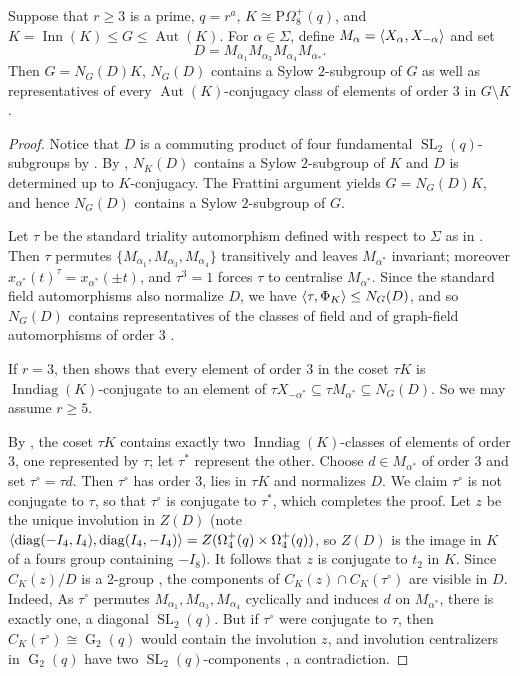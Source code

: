 \documentclass[12pt,a4paper]{amsart}
\DeclareMathOperator{\Aut}{Aut}
\DeclareMathOperator{\Inn}{Inn}
\DeclareMathOperator{\Inndiag}{Inndiag}
\DeclareMathOperator{\G}{G}
\DeclareMathOperator{\SL}{SL}
\DeclareMathOperator{\diag}{diag}
\DeclarePairedDelimiter{\gen}{\langle}{\rangle}
\begin{document}
\begin{lemma}\label{lem:NGD struct}
 Suppose that $r\ge 3$ is a prime, $q=r^a$,    $K\cong \mathrm P \Omega_{8}^+(q)$, and $K=\Inn(K)\le G\le \Aut(K)$.
   For $\alpha \in \Sigma$, define  $M_\alpha= \gen{X_{\alpha},X_{-\alpha}}$ and set $$D= M_{\alpha_1}M_{\alpha_3}M_{\alpha_4}M_{\alpha_*}.$$
 Then $G= N_G(D)K$, $N_G(D)$ contains a Sylow $2$-subgroup of $G$ as well as representatives of every $\Aut(K)$-conjugacy class of elements of order $3$ in $G \setminus K$.
\end{lemma}
\begin{proof} Notice that $ D$ is a commuting product of four fundamental $\SL_2(q)$-subgroups by \cite[Theorem 4.10.6]{GLS3}.
By \cite[Theorem 4.10.6(a),(b)]{GLS3}, $N_K(D)$ contains a Sylow
$2$-subgroup of $K$ and $D$ is determined up to $K$-conjugacy. The
Frattini argument yields $G=N_G(D)K$, and hence $N_G(D)$ contains a
Sylow $2$-subgroup of $G$.

Let $\tau$ be the standard triality automorphism defined with respect to $\Sigma$ as
in \cite[Theorem 2.5.1(d)]{GLS3}. Then $\tau$ permutes
$\{M_{\alpha_1},M_{\alpha_3},M_{\alpha_4}\}$ transitively and leaves
$M_{\alpha^*}$ invariant; moreover $x_{\alpha^*}(t)^\tau
=x_{\alpha^*}(\pm t)$, and $\tau^3=1$ forces
  $\tau$ to centralise $M_{\alpha^*}$. Since the standard
field automorphisms also normalize $D$, we have $\gen{\tau,\Phi_K}\le
N_G(D)$, and so $N_G(D)$ contains representatives of the classes of
field and of graph-field automorphisms of order $3$
\cite[Proposition 4.9.1]{GLS3}.

If $r=3$, then
\cite[Proposition 4.9.2(g)]{GLS3} shows that every element of order $3$ in the coset $\tau K$ is $\Inndiag(K)$-conjugate to an element of $\tau
X_{-\alpha^*}\subseteq \tau M_{\alpha^*} \subseteq N_G(D)$. So we may assume $r \ge 5$.


By \cite[Table 4.7.3A]{GLS3}, the coset $\tau K$ contains exactly two
$\Inndiag(K)$-classes of elements of order $3$, one represented by
$\tau$; let $\tau^*$ represent the other.    Choose $d\in M_{\alpha^*}$ of order $3$ and set
$\tau^\circ=\tau d$. Then $\tau^\circ$ has order $3$, lies in $\tau K$
and normalizes $D$. We claim $\tau^\circ$ is not conjugate to $\tau$,
so that $\tau^\circ$ is conjugate to $\tau^*$, which completes the
proof. Let $z$ be the unique involution in $Z(D)$ (note $\gen{\diag(-I_4,I_4),\diag(I_4,-I_4)}=Z(
\Omega_4^+(q)\times \Omega_4^+(q))$, so $Z(D)$ is the image in $K$ of a fours group
containing $-I_8$). It follows that $z$ is conjugate to $t_2$ in $K$.  Since $C_K(z)/D$ is a $2$-group
\cite[Table 4.5.1]{GLS3}, the components of $C_K(z)\cap
C_K(\tau^\circ)$ are visible in $D$. Indeed, As $\tau^\circ$ permutes
$M_{\alpha_1},M_{\alpha_3},M_{\alpha_4}$ cyclically and induces $d$ on
$M_{\alpha^*}$, there is exactly one, a diagonal $\SL_2(q)$. But if
$\tau^\circ$ were conjugate to $\tau$, then $C_K(\tau^\circ)\cong
\G_2(q)$ would contain the involution $z$, and involution centralizers
in $\G_2(q)$ have two $\SL_2(q)$-components \cite[Table 4.5.1]{GLS3},
a contradiction.
\end{proof}
\end{document}
